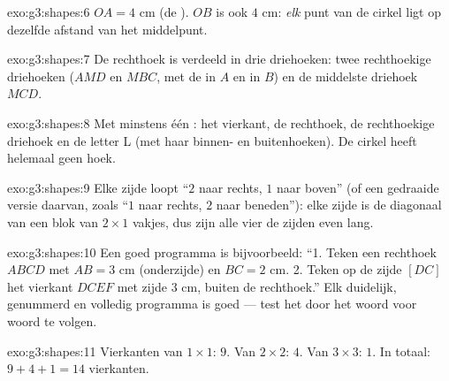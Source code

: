 \begin{solution}{exo:g3:shapes:6}
$OA = 4$ cm (de ). $OB$ is ook $4$ cm: \emph{elk} punt van de cirkel
ligt op dezelfde afstand van het middelpunt.
\end{solution}

\begin{solution}{exo:g3:shapes:7}
De rechthoek is verdeeld in drie driehoeken: twee rechthoekige driehoeken
($AMD$ en $MBC$, met de  in $A$ en in $B$) en de middelste
driehoek $MCD$.
\end{solution}

\begin{solution}{exo:g3:shapes:8}
Met minstens één : het vierkant, de rechthoek, de rechthoekige
driehoek en de letter L (met haar binnen- en buitenhoeken). De cirkel
heeft helemaal geen hoek.
\end{solution}

\begin{solution}{exo:g3:shapes:9}
Elke zijde loopt ``$2$ naar rechts, $1$ naar boven'' (of een gedraaide
versie daarvan, zoals ``$1$ naar rechts, $2$ naar beneden''): elke zijde is
de diagonaal van een blok van $2 \times 1$ vakjes, dus zijn alle vier de
zijden even lang.
\end{solution}

\begin{solution}{exo:g3:shapes:10}
Een goed programma is bijvoorbeeld: ``1. Teken een rechthoek $ABCD$ met
$AB = 3$ cm (onderzijde) en $BC = 2$ cm. 2. Teken op de zijde $[DC]$ het
vierkant $DCEF$ met zijde $3$ cm, buiten de rechthoek.'' Elk duidelijk,
genummerd en volledig programma is goed --- test het door het woord voor
woord te volgen.
\end{solution}

\begin{solution}{exo:g3:shapes:11}
Vierkanten van $1 \times 1$: $9$. Van $2 \times 2$: $4$. Van
$3 \times 3$: $1$. In totaal: $9 + 4 + 1 = 14$ vierkanten.
\end{solution}
